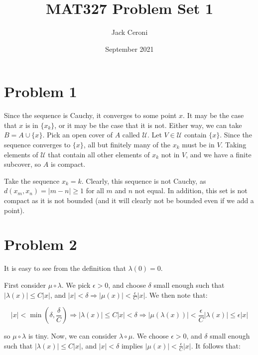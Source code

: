 \documentclass[10pt, oneside]{amsart}
\title{MAT327 Problem Set 1}
\author{Jack Ceroni}
\date{September 2021}
\begin{document}
    \maketitle

    \tableofcontents

    \vspace{.25in}

    \newpage

    \section{Problem 1}

    Since the sequence is Cauchy, it converges to some point $x$. It may be the case that $x$ is in $\{x_k\}$, or it may be the case that it is not. Either way, we can take $B = A \cup \{x\}$.
    Pick an open cover of $A$ called $\mathcal{U}$. Let $V \in \mathcal{U}$ contain $\{x\}$. Since the sequence converges to $\{x\}$, all but finitely many of the $x_k$ must be in $V$. Taking elements of
    $\mathcal{U}$ that contain all other elements of $x_k$ not in $V$, and we have a finite subcover, so $A$ is compact.
    \newline

    Take the sequence $x_k = k$. Clearly, this sequence is not Cauchy, as $d(x_m, x_n) = |m - n| \geq 1$ for all $m$ and $n$ not equal. In addition, this set is not compact
    as it is not bounded (and it will clearly not be bounded even if we add a point).

    \section{Problem 2}

    It is easy to see from the definition that $\lambda(0) = 0$.
    \newline

    First consider $\mu \circ \lambda$. We pick $\epsilon > 0$, and choose $\delta$ small enough such that $|\lambda(x)| \leq C |x|$, and $|x| < \delta \Rightarrow |\mu(x)| < \frac{\epsilon}{C}|x|$. We then note that:

    $$|x| < \min \left( \delta, \frac{\delta}{C} \right) \Rightarrow |\lambda(x)| \leq C |x| < \delta \Rightarrow |\mu(\lambda(x))| < \frac{\epsilon}{C} | \lambda(x)| \leq \epsilon |x|$$

    so $\mu \circ \lambda$ is tiny. Now, we can consider $\lambda \circ \mu$. We choose $\epsilon > 0$, and $\delta$ small enough such that $|\lambda(x)| \leq C|x|$, and $|x| < \delta$ implies $|\mu(x)| < \frac{\epsilon}{C} |x|$. It follows that:
\end{document}
